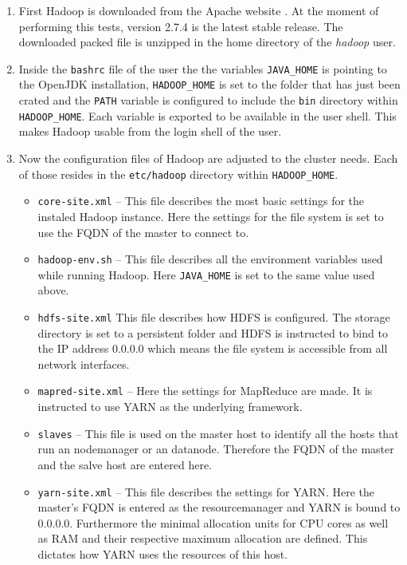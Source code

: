 \begin{enumerate}
    \item First Hadoop is downloaded from the Apache website . 
    At the moment of performing this tests, 
    version 2.7.4 is the latest stable release.
    The downloaded packed file is unzipped in the home directory of the \emph{hadoop} user.
    \item Inside the \texttt{bashrc} file of the user the the variables \texttt{JAVA\_HOME} is pointing to the OpenJDK installation,
    \texttt{HADOOP\_HOME} is set to the folder that has just been crated and the \texttt{PATH} variable is configured to include the \texttt{bin} directory within \texttt{HADOOP\_HOME}.
    Each variable is exported to be available in the user shell.
    This makes Hadoop usable from the login shell of the user.
    \item Now the configuration files of Hadoop are adjusted to the cluster needs. Each of those resides in the \texttt{etc/hadoop} directory within \texttt{HADOOP\_HOME}.
    \begin{itemize}
        \item \texttt{core-site.xml} -- This file describes the most basic settings for the instaled Hadoop instance. 
        Here the settings for the file system is set to use the \ac{FQDN} of the master to connect to.
        \item \texttt{hadoop-env.sh} -- This file describes all the environment variables used while running Hadoop. 
        Here \texttt{JAVA\_HOME} is set to the same value used above.
        \item \texttt{hdfs-site.xml} This file describes how \ac{HDFS} is configured. 
        The storage directory is set to a persistent folder
        and \ac{HDFS} is instructed to bind to the \ac{IP} address 0.0.0.0 
        which means the file system is accessible from all network interfaces.
        \item \texttt{mapred-site.xml} -- Here the settings for MapReduce are made. 
        It is instructed to use \ac{YARN} as the underlying framework.
        \item \texttt{slaves} -- This file is used on the master host to identify all the hosts 
        that run an nodemanager or an datanode.
        Therefore the \acs{FQDN} of the master and the salve host are entered here.
        \item \texttt{yarn-site.xml} -- This file describes the settings for \ac{YARN}. Here the master's \ac{FQDN} is entered as the resourcemanager and \ac{YARN} is bound to 0.0.0.0. 
        Furthermore the minimal allocation units for \ac{CPU} cores 
        as well as \ac{RAM} and their respective maximum allocation are defined. 
        This dictates how \ac{YARN} uses the resources of this host.
    \end{itemize}
\end{enumerate}

